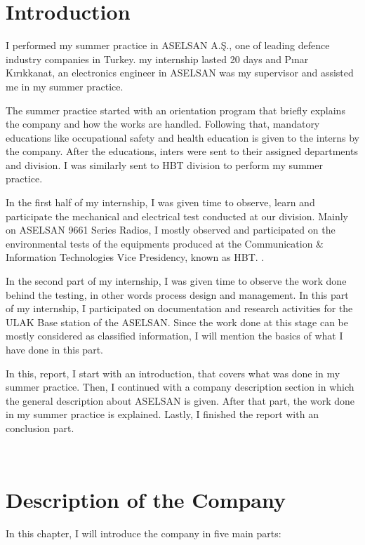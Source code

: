 \blankpage



\tableofcontents
\newpage



\section{Introduction}
\-\indent 
	I performed my summer practice in ASELSAN A.Ş., one of leading defence industry companies in Turkey. my internship lasted 20 days and Pınar Kırıkkanat, an electronics engineer in ASELSAN was my supervisor and assisted me in my summer practice.

	The summer practice started with an orientation program that briefly explains the company and how the works are handled. Following that, mandatory educations like occupational safety and health education is given to the interns by the company. After the educations, inters were sent to their assigned departments and division. I was similarly sent to HBT division to perform my summer practice.
	
	In the first half of my internship, I was given time to observe, learn and participate the mechanical and electrical test conducted at our division. Mainly on ASELSAN 9661 Series Radios, I mostly observed and participated on the environmental tests of the equipments produced at the Communication \& Information Technologies Vice Presidency, known as HBT. .
	
	In the second part of my internship, I was given time to observe the work done behind the testing, in other words process design and management. In this part of my internship, I participated on documentation and research activities for the ULAK Base station of the ASELSAN. Since the work done at this stage can be mostly considered as classified information, I will mention the basics of what I have done in this part.
	
	In this, report, I start with an introduction, that covers what was done in my summer practice. Then, I continued with a company description section in which the general description about ASELSAN is given. After that part, the work done in my summer practice is explained. Lastly, I finished the report with an conclusion part. 
	
	
\- \\[2cm]
 

\section{Description of the Company}
\- \indent
	In this chapter, I will introduce the company in five main parts:



